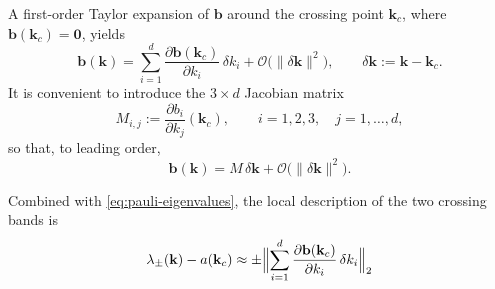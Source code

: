 \documentclass[11pt]{article}
\numberwithin{equation}{section}
\begin{document}
A first-order Taylor expansion of \(\mathbf{b}\) around the crossing point
\(\mathbf{k}_c\), where \(\mathbf{b}(\mathbf{k}_c)=\mathbf{0}\), yields
\begin{equation}
    \mathbf{b}(\mathbf{k})
    =\sum_{i=1}^{d}\frac{\partial\mathbf{b}(\mathbf{k}_c)}{\partial k_i}\,
    \delta k_i
    +\mathcal{O}\!\bigl(\lVert\delta\mathbf{k}\rVert^2\bigr),
    \qquad \delta\mathbf{k}:=\mathbf{k}-\mathbf{k}_c.
\end{equation}
It is convenient to introduce the \(3\times d\) Jacobian matrix
\begin{equation}
    M_{i,j}:=\frac{\partial b_i}{\partial k_j}(\mathbf{k}_c),
    \qquad i=1,2,3,\quad j=1,\dots,d,
    \label{eq:Jacobi-M}
\end{equation}
so that, to leading order,
\begin{equation}
    \mathbf{b}(\mathbf{k}) = M\,\delta\mathbf{k}
    +\mathcal{O}\!\bigl(\lVert\delta\mathbf{k}\rVert^2\bigr).
    \label{eq:b-linear}
\end{equation}

Combined with \eqref{eq:pauli-eigenvalues}, the local description of the two
crossing bands is
\begin{equation}
    \lambda_{\pm}(\mathbf{k})-a(\mathbf{k}_c)
    \approx \pm\Bigl\lVert\sum_{i=1}^{d}
    \frac{\partial\mathbf{b}(\mathbf{k}_c)}{\partial k_i}\,
    \delta k_i\Bigr\rVert_2
    \label{eq:local-cone}
\end{equation}

\sloppy
\printbibliography %
\fussy
\end{document}
